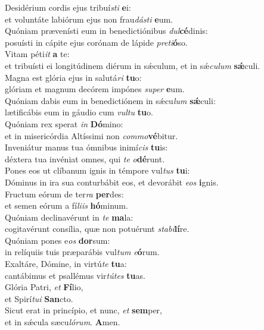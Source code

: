 \evenverse Desidérium cordis ejus tribuí\textit{sti} \textbf{e}i:~\*\\
\evenverse et voluntáte labiórum ejus non frau\textit{dá}\textit{sti} \textbf{e}um.\\
\oddverse Quóniam prævenísti eum in benedictiónibus \textit{dul}\textbf{cé}dinis:~\*\\
\oddverse posuísti in cápite ejus corónam de lápide \textit{pre}\textit{ti}\textbf{ó}so.\\
\evenverse Vitam péti\textit{it} \textbf{a} te:~\*\\
\evenverse et tribuísti ei longitúdinem diérum in sǽculum, et in sǽ\textit{cu}\textit{lum} \textbf{sǽ}culi.\\
\oddverse Magna est glória ejus in salutá\textit{ri} \textbf{tu}o:~\*\\
\oddverse glóriam et magnum decórem impónes \textit{su}\textit{per} \textbf{e}um.\\
\evenverse Quóniam dabis eum in benedictiónem in sǽcu\textit{lum} \textbf{sǽ}culi:~\*\\
\evenverse lætificábis eum in gáudio cum \textit{vul}\textit{tu} \textbf{tu}o.\\
\oddverse Quóniam rex sperat \textit{in} \textbf{Dó}mino:~\*\\
\oddverse et in misericórdia Altíssimi non \textit{com}\textit{mo}\textbf{vé}bitur.\\
\evenverse Inveniátur manus tua ómnibus inimí\textit{cis} \textbf{tu}is:~\*\\
\evenverse déxtera tua invéniat omnes, qui \textit{te} \textit{o}\textbf{dé}runt.\\
\oddverse Pones eos ut clíbanum ignis in témpore vul\textit{tus} \textbf{tu}i:~\*\\
\oddverse Dóminus in ira sua conturbábit eos, et devorábit \textit{e}\textit{os} \textbf{i}gnis.\\
\evenverse Fructum eórum de ter\textit{ra} \textbf{per}des:~\*\\
\evenverse et semen eórum a fí\textit{li}\textit{is} \textbf{hó}minum.\\
\oddverse Quóniam declinavérunt in \textit{te} \textbf{ma}la:~\*\\
\oddverse cogitavérunt consília, quæ non potuérunt \textit{sta}\textit{bi}\textbf{lí}re.\\
\evenverse Quóniam pones e\textit{os} \textbf{dor}sum:~\*\\
\evenverse in relíquiis tuis præparábis vul\textit{tum} \textit{e}\textbf{ó}rum.\\
\oddverse Exaltáre, Dómine, in virtú\textit{te} \textbf{tu}a:~\*\\
\oddverse cantábimus et psallémus vir\textit{tú}\textit{tes} \textbf{tu}as.\\
\evenverse Glória Patri, \textit{et} \textbf{Fí}lio,~\*\\
\evenverse et Spirí\textit{tu}\textit{i} \textbf{San}cto.\\
\oddverse Sicut erat in princípio, et nunc, \textit{et} \textbf{sem}per,~\*\\
\oddverse et in sǽcula sæcu\textit{ló}\textit{rum}. \textbf{A}men.\\
